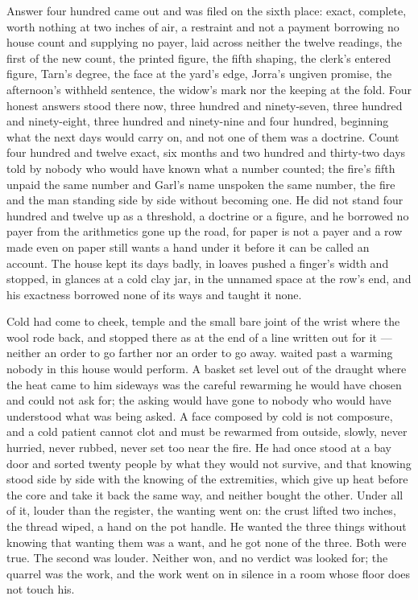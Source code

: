 Answer four hundred came out and was filed on the sixth place: exact, complete, worth nothing at two inches of air, a restraint and not a payment borrowing no house count and supplying no payer, laid across neither the twelve readings, the first of the new count, the printed figure, the fifth shaping, the clerk's entered figure, Tarn's degree, the face at the yard's edge, Jorra's ungiven promise, the afternoon's withheld sentence, the widow's mark nor the keeping at the fold. Four honest answers stood there now, three hundred and ninety-seven, three hundred and ninety-eight, three hundred and ninety-nine and four hundred, beginning what the next days would carry on, and not one of them was a doctrine. Count four hundred and twelve exact, six months and two hundred and thirty-two days told by nobody who would have known what a number counted; the fire's fifth unpaid the same number and Garl's name unspoken the same number, the fire and the man standing side by side without becoming one. He did not stand four hundred and twelve up as a threshold, a doctrine or a figure, and he borrowed no payer from the arithmetics gone up the road, for paper is not a payer and a row made even on paper still wants a hand under it before it can be called an account. The house kept its days badly, in loaves pushed a finger's width and stopped, in glances at a cold clay jar, in the unnamed space at the row's end, and his exactness borrowed none of its ways and taught it none.

Cold had come to cheek, temple and the small bare joint of the wrist where the wool rode back, and stopped there as at the end of a line written out for it --- neither an order to go farther nor an order to go away.  waited past a warming nobody in this house would perform. A basket set level out of the draught where the heat came to him sideways was the careful rewarming he would have chosen and could not ask for; the asking would have gone to nobody who would have understood what was being asked. A face composed by cold is not composure, and a cold patient cannot clot and must be rewarmed from outside, slowly, never hurried, never rubbed, never set too near the fire. He had once stood at a bay door and sorted twenty people by what they would not survive, and that knowing stood side by side with the knowing of the extremities, which give up heat before the core and take it back the same way, and neither bought the other. Under all of it, louder than the register, the wanting went on: the crust lifted two inches, the thread wiped, a hand on the pot handle. He wanted the three things without knowing that wanting them was a want, and he got none of the three. Both were true. The second was louder. Neither won, and no verdict was looked for; the quarrel was the work, and the work went on in silence in a room whose floor does not touch his.

